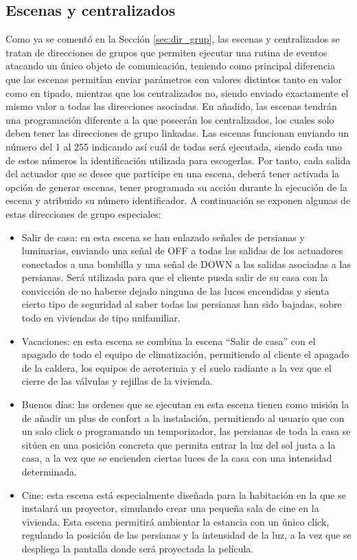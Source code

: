 \subsection{Escenas y centralizados}Como ya se comentó en la Sección \ref{sec:dir_grup}, las escenas y centralizados se tratan de direcciones de grupos que permiten ejecutar una rutina de eventos atacando un único objeto de comunicación, teniendo como principal diferencia que las escenas permitían enviar parámetros con valores distintos tanto en valor como en tipado, mientras que los centralizados no, siendo enviado exactamente el mismo valor a todas las direcciones asociadas. En añadido, las escenas tendrán una programación diferente a la que poseerán los centralizados, los cuales solo deben tener las direcciones de grupo linkadas. Las escenas funcionan enviando un número del 1 al 255 indicando así cuál de todas será ejecutada, siendo cada uno de estos números la identificación utilizada para escogerlas. Por tanto, cada salida del actuador que se desee que participe en una escena, deberá tener activada la opción de generar escenas, tener programada su acción durante la ejecución de la escena y atribuido su número identificador. A continuación se exponen algunas de estas direcciones de grupo especiales:
\begin{itemize}
\item Salir de casa: en esta escena se han enlazado señales de persianas y luminarias, enviando una señal de OFF a todas las salidas de los actuadores conectados a una bombilla y una señal de DOWN a las salidas asociadas a las persianas. Será utilizada para que el cliente pueda salir de su casa con la convicción de no haberse dejado ninguna de las luces encendidas y sienta cierto tipo de seguridad al saber todas las persianas han sido bajadas, sobre todo en viviendas de tipo unifamiliar.
\item Vacaciones: en esta escena se combina la escena “Salir de casa” con el apagado de todo el equipo de climatización, permitiendo al cliente el apagado de la caldera, los equipos de aerotermia y el suelo radiante a la vez que el cierre de las válvulas y rejillas de la vivienda.
\item Buenos días: las ordenes que se ejecutan en esta escena tienen como misión la de añadir un plus de confort a la instalación, permitiendo al usuario que con un salo click o programando un temporizador, las persianas de toda la casa se sitúen en una posición concreta que permita entrar la luz del sol justa a la casa, a la vez que se encienden ciertas luces de la casa con una intensidad determinada.
\item Cine: esta escena está especialmente diseñada para la habitación en la que se instalará un proyector, simulando crear una pequeña sala de cine en la vivienda. Esta escena permitirá ambientar la estancia con un único click, regulando la posición de las persianas y la intensidad de la luz, a la vez que se despliega la pantalla donde será proyectada la película.
\end{itemize}

